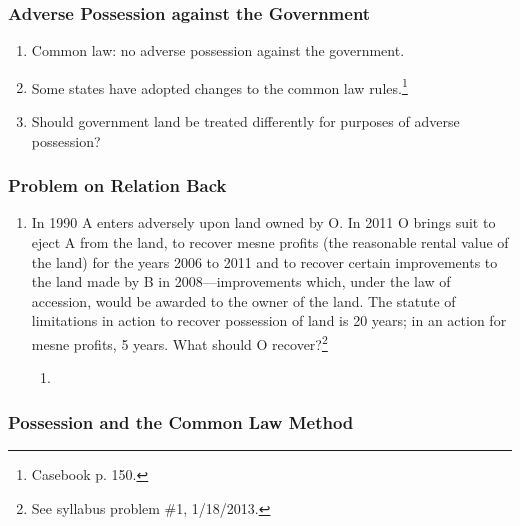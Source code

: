 \subsubsection{Adverse Possession against the Government}

\begin{enumerate}
    \item Common law: no adverse possession against the government.
    \item Some states have adopted changes to the common law 
    rules.\footnote{Casebook p. 150.}
    \item Should government land be treated differently for purposes of 
    adverse possession?
\end{enumerate}

\subsubsection{Problem on Relation Back}

\begin{enumerate}
    \item In 1990 A enters adversely upon land owned by O. In 2011 O brings 
    suit to eject A from the land, to recover mesne profits (the reasonable 
    rental value of the land) for the years 2006 to 2011 and to recover 
    certain improvements to the land made by B in 2008---improvements which, 
    under the law of accession, would be awarded to the owner of the land. 
    The statute of limitations in action to recover possession of land is 20 
    years; in an action for mesne profits, 5 years. What should O 
    recover?\footnote{See syllabus problem \#1, 1/18/2013.}
    \begin{enumerate}
        \item %
    \end{enumerate}
\end{enumerate}

\subsubsection{Possession and the Common Law Method}

